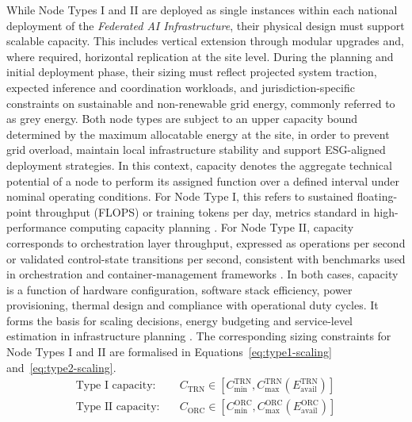 \documentclass[oneside,10pt]{swissi}
\begin{document}
While Node Types I and II are deployed as single instances within each national deployment of the \textit{Federated AI Infrastructure}, their physical design must support scalable capacity. This includes vertical extension through modular upgrades and, where required, horizontal replication at the site level. During the planning and initial deployment phase, their sizing must reflect projected system traction, expected inference and coordination workloads, and jurisdiction-specific constraints on sustainable and non-renewable grid energy, commonly referred to as grey energy. Both node types are subject to an upper capacity bound determined by the maximum allocatable energy at the site, in order to prevent grid overload, maintain local infrastructure stability and support ESG-aligned deployment strategies. In this context, capacity denotes the aggregate technical potential of a node to perform its assigned function over a defined interval under nominal operating conditions. For Node Type I, this refers to sustained floating-point throughput (FLOPS) or training tokens per day, metrics standard in high-performance computing capacity planning \cite{rand2024,supercomputer2024}. For Node Type II, capacity corresponds to orchestration layer throughput, expressed as operations per second or validated control-state transitions per second, consistent with benchmarks used in orchestration and container-management frameworks \cite{straesser2023,search7}. In both cases, capacity is a function of hardware configuration, software stack efficiency, power provisioning, thermal design and compliance with operational duty cycles. It forms the basis for scaling decisions, energy budgeting and service-level estimation in infrastructure planning \cite{tierpoint2023,rand2024}. The corresponding sizing constraints for Node Types I and II are formalised in Equations~\eqref{eq:type1-scaling} and~\eqref{eq:type2-scaling}.
\begin{align}
  \text{Type I capacity:} \quad & C_{\text{TRN}} \in [C_{\text{min}}^{\text{TRN}}, C_{\text{max}}^{\text{TRN}}(E_{\text{avail}}^{\text{TRN}})] \label{eq:type1-scaling} \\
  \text{Type II capacity:} \quad & C_{\text{ORC}} \in [C_{\text{min}}^{\text{ORC}}, C_{\text{max}}^{\text{ORC}}(E_{\text{avail}}^{\text{ORC}})] \label{eq:type2-scaling}
\end{align}
\end{document}
